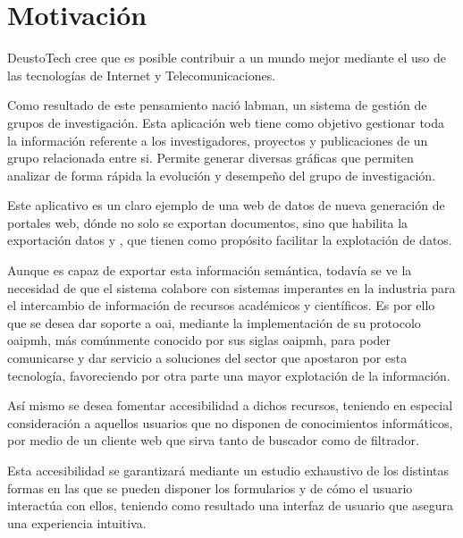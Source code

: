 

\section{Motivación}

DeustoTech cree que es posible contribuir a un mundo mejor mediante el uso de las tecnologías de Internet y Telecomunicaciones.

Como resultado de este pensamiento nació \acrshort{labman}, un sistema de gestión de grupos de investigación. Esta aplicación web tiene como objetivo gestionar toda la información referente a los investigadores, proyectos y publicaciones de un grupo relacionada entre si. Permite generar diversas gráficas que permiten analizar de forma rápida la evolución y desempeño del grupo de investigación.

Este aplicativo es un claro ejemplo de una web de datos de nueva generación de portales web, dónde no solo se exportan documentos, sino que habilita la exportación datos y , que tienen como propósito facilitar la explotación de datos.

Aunque es capaz de exportar esta información semántica, todavía se ve la necesidad de que el sistema colabore con sistemas imperantes en la industria para el intercambio de información de recursos académicos y científicos.
Es por ello que se desea dar soporte a \acrshort{oai}, mediante la implementación de su protocolo \acrlong{oaipmh}, más comúnmente conocido por sus siglas \acrshort{oaipmh}, para poder comunicarse y dar servicio a soluciones del sector que apostaron por esta tecnología, favoreciendo por otra parte una mayor explotación de la información.

Así mismo se desea fomentar accesibilidad a dichos recursos, teniendo en especial consideración a aquellos usuarios que no disponen de conocimientos informáticos, por medio de un cliente web que sirva tanto de buscador como de filtrador.

Esta accesibilidad se garantizará mediante un estudio exhaustivo de los distintas formas en las que se pueden disponer los formularios y de cómo el usuario interactúa con ellos, teniendo como resultado una interfaz de usuario que asegura una experiencia intuitiva.
